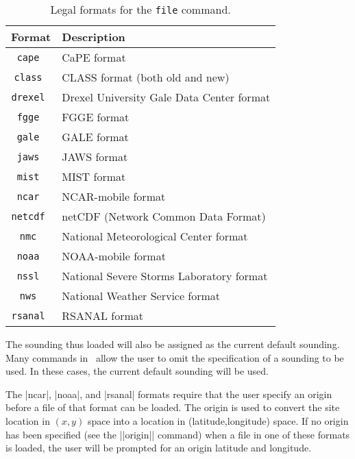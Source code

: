 \begin{table}[tp]
	\begin{center}
	\begin{tabular}{|c|l|}
		\hline
		Format		& Description \\
		\hline \hline
		\tt cape	& CaPE format \\
		\tt class	& CLASS format (both old and new) \\
                \tt drexel      & Drexel University Gale Data Center format \\
		\tt fgge	& FGGE format \\
		\tt gale	& GALE format \\
		\tt jaws	& JAWS format \\
		\tt mist	& MIST format \\
		\tt ncar	& NCAR-mobile format \\
		\tt netcdf	& netCDF (Network Common Data Format) \\
		\tt nmc		& National Meteorological Center format \\
		\tt noaa	& NOAA-mobile format \\
		\tt nssl	& National Severe Storms Laboratory format \\
		\tt nws		& National Weather Service format\\
		\tt rsanal	& RSANAL format \\ \hline
	\end{tabular}
	\end{center}
	\caption{Legal formats for the {\tt file} command.}
	\label{tbl-formats}
\end{table}

The sounding thus loaded will also be assigned as the current
default sounding.  Many commands in \suds\ allow the user to omit the 
specification of a sounding to be used.  In these cases, the current default
sounding will be used.

The |ncar|, |noaa|, and |rsanal| formats require that the user specify an
origin before a file of that format can be loaded.  The origin is used to
convert the site location in $(x,y)$ space into a location in
(latitude,longitude) space.  If no origin has been specified (see the
||origin|| command) when a file in one of these formats is loaded, the user 
will be prompted for an origin latitude and longitude.

